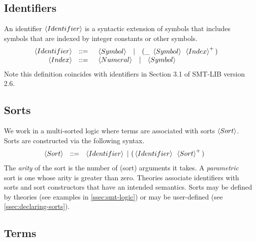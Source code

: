 \documentclass[english,a4paper,10pt]{article}
\begin{document}
\subsection{Identifiers}

An identifier $\left\langle Identifier\right\rangle$
is a syntactic extension of symbols 
that includes symbols that are indexed by integer constants or other symbols.
\[
\begin{array}{rcl}
\left\langle Identifier\right\rangle & ::= & \begin{array}{ccc}
\left\langle Symbol\right\rangle & | & {\tt (}{\tt \_}\mbox{ }\left\langle Symbol\right\rangle\mbox{ }\left\langle Index\right\rangle^{+}{\tt )}
\end{array}\\
\left\langle Index\right\rangle & ::= & \begin{array}{ccc}
\left\langle Numeral\right\rangle & | & \left\langle Symbol\right\rangle
\end{array}\\
\end{array}
\]
Note this definition coincides with
identifiers in Section 3.1 of SMT-LIB version 2.6.

\subsection{Sorts}

We work in a multi-sorted logic where terms 
are associated with sorts $\left\langle Sort\right\rangle$.
Sorts are constructed via the following syntax.
\begin{alignat*}{1}
 & \begin{array}{rcl}
\left\langle Sort\right\rangle & ::= & \left\langle Identifier\right\rangle\mbox{ }|\mbox{ }{\tt (}\left\langle Identifier\right\rangle\mbox{ }\left\langle Sort\right\rangle^{+}{\tt )}\\
\end{array}
\end{alignat*}
The \emph{arity} of the sort is the number of (sort) arguments it takes.
A \emph{parametric} sort is one whose arity is greater than zero.
Theories associate identifiers with sorts and sort constructors
that have an intended semantics.
Sorts may be defined by theories (see examples in \cref{ssec:smt-logic})
or may be user-defined
(see \cref{ssec:declaring-sorts}).

\subsection{Terms}
\end{document}
